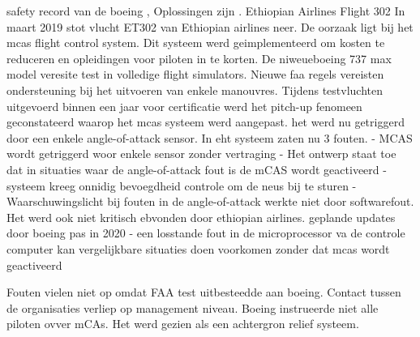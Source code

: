 safety record van de boeing
\cite{touitou11032019737tragedies},
 Oplossingen zijn \cite{caa737modifications}. 
 Ethiopian Airlines Flight 302
In maart 2019 stot vlucht ET302 van Ethiopian airlines neer. De oorzaak ligt bij het mcas flight control system. Dit systeem werd geimplementeerd om kosten te reduceren en opleidingen voor piloten  in te korten. De niweueboeing 737 max model veresite test in volledige flight simulators. Nieuwe faa regels vereisten ondersteuning bij het uitvoeren van enkele manouvres. Tijdens testvluchten uitgevoerd binnen een jaar voor certificatie werd het pitch-up fenomeen geconstateerd waarop het mcas systeem werd aangepast. het werd nu getriggerd door een enkele angle-of-attack sensor.
In eht systeem zaten nu 3 fouten.
- MCAS wordt getriggerd woor enkele sensor zonder vertraging
- Het ontwerp staat toe dat  in situaties waar de angle-of-attack fout is de mCAS wordt geactiveerd
- systeem kreeg onnidig bevoegdheid controle om de neus bij te sturen
- Waarschuwingslicht bij fouten in de angle-of-attack werkte niet door  softwarefout. Het werd ook niet kritisch ebvonden door ethiopian airlines. geplande updates door boeing pas in 2020
- een losstande fout in de microprocessor va de controle computer kan vergelijkbare situaties doen voorkomen zonder dat mcas wordt geactiveerd

Fouten vielen niet op omdat FAA test uitbesteedde aan boeing. Contact tussen de organisaties verliep op management niveau. Boeing instrueerde niet alle piloten ovver mCAs. Het werd gezien als een achtergron relief systeem.


